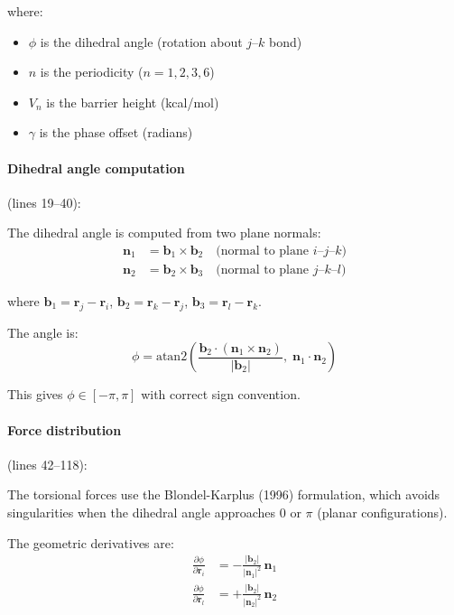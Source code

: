 \documentclass[11pt]{article}
\begin{document}
where:
\begin{itemize}
\item $\phi$ is the dihedral angle (rotation about $j$--$k$ bond)
\item $n$ is the periodicity ($n = 1, 2, 3, 6$)
\item $V_n$ is the barrier height (kcal/mol)
\item $\gamma$ is the phase offset (radians)
\end{itemize}

\paragraph{Dihedral angle computation} (lines 19--40):

The dihedral angle is computed from two plane normals:
\begin{align}
\mathbf{n}_1 &= \mathbf{b}_1 \times \mathbf{b}_2 \quad \text{(normal to plane } i\text{--}j\text{--}k\text{)} \\
\mathbf{n}_2 &= \mathbf{b}_2 \times \mathbf{b}_3 \quad \text{(normal to plane } j\text{--}k\text{--}l\text{)}
\end{align}

where $\mathbf{b}_1 = \mathbf{r}_j - \mathbf{r}_i$, $\mathbf{b}_2 = \mathbf{r}_k - \mathbf{r}_j$, $\mathbf{b}_3 = \mathbf{r}_l - \mathbf{r}_k$.

The angle is:
\begin{equation}
\phi = \text{atan2}\!\left(\frac{\mathbf{b}_2 \cdot (\mathbf{n}_1 \times \mathbf{n}_2)}{|\mathbf{b}_2|}, \; \mathbf{n}_1 \cdot \mathbf{n}_2\right)
\end{equation}

This gives $\phi \in [-\pi, \pi]$ with correct sign convention.

\paragraph{Force distribution} (lines 42--118):

The torsional forces use the Blondel-Karplus (1996) formulation, which avoids singularities when the dihedral angle approaches $0$ or $\pi$ (planar configurations).

The geometric derivatives are:
\begin{align}
\frac{\partial\phi}{\partial\mathbf{r}_i} &= -\frac{|\mathbf{b}_2|}{|\mathbf{n}_1|^2}\,\mathbf{n}_1 \\
\frac{\partial\phi}{\partial\mathbf{r}_l} &= +\frac{|\mathbf{b}_2|}{|\mathbf{n}_2|^2}\,\mathbf{n}_2
\end{align}
\end{document}
